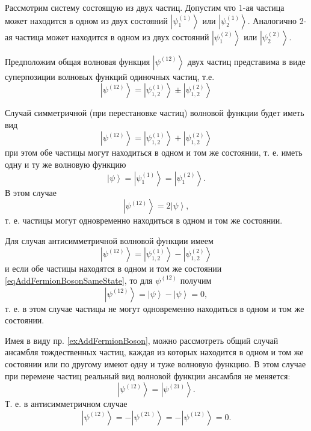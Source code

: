 \begin{example}
  Рассмотрим систему состоящую из двух частиц. Допустим что 1-ая частица
  может находится в одном из двух состояний $\left|\psi^{(1)}_1\right>$
  или $\left|\psi^{(1)}_2\right>$. Аналогично 2-ая частица может
  находится в одном из двух состояний $\left|\psi^{(2)}_1\right>$
  или $\left|\psi^{(2)}_2\right>$.

  Предположим общая волновая функция $\left|\psi^{(12)}\right>$ двух
  частиц представима в виде суперпозиции волновых функций одиночных
  частиц, т.е. 
  \begin{equation}
    \left|\psi^{(12)}\right> = \left|\psi^{(1)}_{1,2}\right> \pm
    \left|\psi^{(2)}_{1,2}\right>
    \nonumber
  \end{equation}

  Случай симметричной (при перестановке частиц) волновой функции будет
  иметь вид
  \begin{equation}
    \left|\psi^{(12)}\right> = \left|\psi^{(1)}_{1,2}\right> +
    \left|\psi^{(2)}_{1,2}\right>
    \nonumber
  \end{equation}
  при этом обе частицы могут находиться в одном и том же состоянии,
  т. е. иметь одну и ту же волновую функцию
  \begin{equation}
  \left|\psi\right> = \left|\psi^{(1)}_{1}\right> =
  \left|\psi^{(2)}_{1}\right>.
  \label{eqAddFermionBosonSameState}
  \end{equation}
  В этом случае
  \[
  \left|\psi^{(12)}\right> = 2 \left|\psi\right>, 
  \]
  т. е. частицы могут одновременно находиться в одном и том же
  состоянии.

  Для случая антисимметричной волновой функции имеем
  \begin{equation}
    \left|\psi^{(12)}\right> = \left|\psi^{(1)}_{1,2}\right> -
    \left|\psi^{(2)}_{1,2}\right>
    \nonumber
  \end{equation}
  и если обе частицы находятся в одном и том же состоянии
  \eqref{eqAddFermionBosonSameState}, то для $\psi^{(12)}$ получим
  \[
  \left|\psi^{(12)}\right> = \left|\psi\right> -\left|\psi\right> = 0,
  \]
  т. е. в этом случае частицы не могут одновременно находиться в одном
  и том же состоянии.
  \label{exAddFermionBoson}
\end{example}
Имея в виду пр. \ref{exAddFermionBoson}, можно рассмотреть общий
случай ансамбля тождественных частиц, каждая из которых находится в
одном и том же состоянии или по другому имеют одну и туже волновую
функцию. В этом случае при перемене частиц реальный вид волновой
функции ансамбля не меняется:
\[
\left|\psi^{(12)}\right> = \left|\psi^{(21)}\right>.
\]
Т. е. в антисимметричном случае 
\[
\left|\psi^{(12)}\right> = - \left|\psi^{(21)}\right> =
-\left|\psi^{(12)}\right> = 0.
\] 

